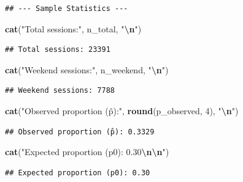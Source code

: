 \documentclass[
  12pt,
]{article}
\newenvironment{Shaded}{\begin{snugshade}}{\end{snugshade}}
\newcommand{\DecValTok}[1]{\textcolor[rgb]{0.00,0.00,0.81}{#1}}
\newcommand{\FunctionTok}[1]{\textcolor[rgb]{0.13,0.29,0.53}{\textbf{#1}}}
\newcommand{\NormalTok}[1]{#1}
\newcommand{\SpecialCharTok}[1]{\textcolor[rgb]{0.81,0.36,0.00}{\textbf{#1}}}
\newcommand{\StringTok}[1]{\textcolor[rgb]{0.31,0.60,0.02}{#1}}
\begin{document}
\begin{verbatim}
## --- Sample Statistics ---
\end{verbatim}

\begin{Shaded}
\begin{Highlighting}[]
\FunctionTok{cat}\NormalTok{(}\StringTok{"Total sessions:"}\NormalTok{, n\_total, }\StringTok{"}\SpecialCharTok{\textbackslash{}n}\StringTok{"}\NormalTok{)}
\end{Highlighting}
\end{Shaded}

\begin{verbatim}
## Total sessions: 23391
\end{verbatim}

\begin{Shaded}
\begin{Highlighting}[]
\FunctionTok{cat}\NormalTok{(}\StringTok{"Weekend sessions:"}\NormalTok{, n\_weekend, }\StringTok{"}\SpecialCharTok{\textbackslash{}n}\StringTok{"}\NormalTok{)}
\end{Highlighting}
\end{Shaded}

\begin{verbatim}
## Weekend sessions: 7788
\end{verbatim}

\begin{Shaded}
\begin{Highlighting}[]
\FunctionTok{cat}\NormalTok{(}\StringTok{"Observed proportion (p̂):"}\NormalTok{, }\FunctionTok{round}\NormalTok{(p\_observed, }\DecValTok{4}\NormalTok{), }\StringTok{"}\SpecialCharTok{\textbackslash{}n}\StringTok{"}\NormalTok{)}
\end{Highlighting}
\end{Shaded}

\begin{verbatim}
## Observed proportion (p̂): 0.3329
\end{verbatim}

\begin{Shaded}
\begin{Highlighting}[]
\FunctionTok{cat}\NormalTok{(}\StringTok{"Expected proportion (p0): 0.30}\SpecialCharTok{\textbackslash{}n\textbackslash{}n}\StringTok{"}\NormalTok{)}
\end{Highlighting}
\end{Shaded}

\begin{verbatim}
## Expected proportion (p0): 0.30
\end{verbatim}
\end{document}
